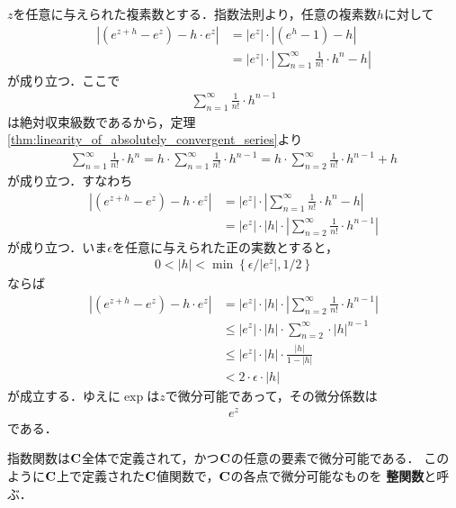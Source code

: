 	\begin{sketch}
		$z$を任意に与えられた複素数とする．指数法則より，任意の複素数$h$に対して
		\begin{align}
			|(e^{z+h} - e^{z}) - h \cdot e^{z}|
			&= |e^{z}| \cdot |(e^{h} - 1) - h| \\
			&= |e^{z}| \cdot \left|\sum_{n=1}^\infty \frac{1}{n!} \cdot h^n - h\right|
		\end{align}
		が成り立つ．ここで
		\begin{align}
			\sum_{n=1}^\infty \frac{1}{n!} \cdot h^{n-1}
		\end{align}
		は絶対収束級数であるから，定理\ref{thm:linearity_of_absolutely_convergent_series}より
		\begin{align}
			\sum_{n=1}^\infty \frac{1}{n!} \cdot h^{n}
			= h \cdot \sum_{n=1}^\infty \frac{1}{n!} \cdot h^{n-1}
			= h \cdot \sum_{n=2}^\infty \frac{1}{n!} \cdot h^{n-1} + h
		\end{align}
		が成り立つ．すなわち
		\begin{align}
			|(e^{z+h} - e^{z}) - h \cdot e^{z}|
			&= |e^{z}| \cdot \left|\sum_{n=1}^\infty \frac{1}{n!} \cdot h^n - h\right| \\
			&= |e^{z}| \cdot |h| \cdot \left|\sum_{n=2}^\infty \frac{1}{n!} \cdot h^{n-1}\right|
		\end{align}
		が成り立つ．いま$\epsilon$を任意に与えられた正の実数とすると，
		\begin{align}
			0 < |h| < \min\left\{\epsilon/|e^{z}|,1/2\right\}
		\end{align}
		ならば
		\begin{align}
			|(e^{z+h} - e^{z}) - h \cdot e^{z}|
			&= |e^{z}| \cdot |h| \cdot \left|\sum_{n=2}^\infty \frac{1}{n!} \cdot h^{n-1}\right| \\
			&\leq |e^{z}| \cdot |h| \cdot \sum_{n=2}^\infty \cdot |h|^{n-1} \\
			&\leq |e^{z}| \cdot |h| \cdot \frac{|h|}{1-|h|} \\
			&< 2 \cdot \epsilon \cdot |h|
		\end{align}
		が成立する．ゆえに$\exp$は$z$で微分可能であって，その微分係数は
		\begin{align}
			e^{z}
		\end{align}
		である．
		\QED
	\end{sketch}
	
	指数関数は$\mathbf{C}$全体で定義されて，かつ$\mathbf{C}$の任意の要素で微分可能である．
	このように$\mathbf{C}$上で定義された$\mathbf{C}$値関数で，$\mathbf{C}$の各点で微分可能なものを
	{\bf 整関数}と呼ぶ．
	
